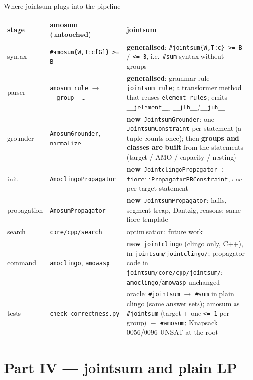 \documentclass[aspectratio=169,11pt]{beamer}
\newcommand{\file}[1]{{\small\texttt{\color{acc}#1}}}
\newcommand{\NEW}{\textcolor{new}{\textbf{new}}}
\newcommand{\GEN}{\textcolor{keep}{\textbf{generalised}}}
\begin{document}
\begin{frame}{Where jointsum plugs into the pipeline}
\scriptsize
\setlength{\tabcolsep}{3pt}
\renewcommand{\arraystretch}{1.05}
\begin{tabular}{>{\raggedright\arraybackslash}p{15mm}>{\raggedright\arraybackslash}p{33mm}>{\raggedright\arraybackslash}p{92mm}}\toprule
stage & amosum (untouched) & jointsum \\\midrule
syntax & \texttt{\#amosum\{W,T:c[G]\} >= B} & \GEN: \texttt{\#jointsum\{W,T:c\} >= B} / \texttt{<= B}, i.e.\ \texttt{\#sum} syntax without groups\\
parser & \texttt{amosum\_rule} $\to$ \texttt{\_\_group\_\_}\dots & \GEN: grammar rule \texttt{jointsum\_rule}; a transformer method that reuses \texttt{element\_rules}; emits \texttt{\_\_jelement\_\_}, \texttt{\_\_jlb\_\_}/\texttt{\_\_jub\_\_}\\
grounder & \texttt{AmosumGrounder}, \texttt{normalize} & \NEW\ \texttt{JointsumGrounder}: one \texttt{JointsumConstraint} per statement (a tuple counts once); then \textbf{groups and classes are built} from the statements (target / AMO / capacity / nesting)\\
init & \texttt{AmoclingoPropagator} & \NEW\ \texttt{JointclingoPropagator : fiore::PropagatorPBConstraint}, one per target statement\\
propagation & \texttt{AmosumPropagator} & \NEW\ \texttt{JointsumPropagator}: hulls, segment treap, Dantzig, reasons; same fiore template\\
search & \texttt{core/cpp/search} & optimisation: future work\\
command & \texttt{amoclingo}, \texttt{amowasp} & \NEW\ \texttt{jointclingo} (clingo only, C++), in \file{jointsum/jointclingo/}; propagator code in \file{jointsum/core/cpp/jointsum/}; \texttt{amoclingo}/\texttt{amowasp} unchanged\\
tests & \texttt{check\_correctness.py} & oracle: \texttt{\#jointsum} $\to$ \texttt{\#sum} in plain clingo (same answer sets);
  amosum as \texttt{\#jointsum} (target + one \texttt{<= 1} per group) $\equiv$ \texttt{\#amosum}; Knapsack 0056/0096 UNSAT at the root\\\bottomrule
\end{tabular}
\end{frame}

\section{Part IV --- jointsum and plain LP}
\end{document}
